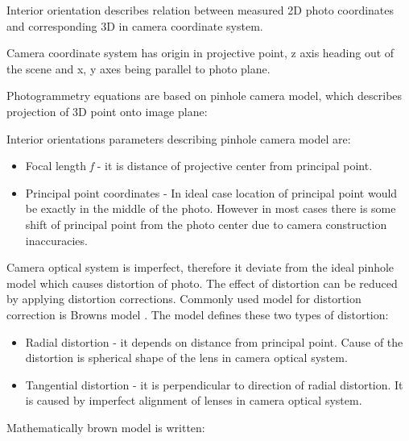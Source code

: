 \documentclass[a4paper,12pt]{article}
\newcommand{\escal}[1]{
{\it #1}
}
\begin{document}
Interior orientation describes relation between measured 2D photo coordinates 
and corresponding 3D in camera coordinate system.

Camera coordinate system has origin in projective point, z axis heading out of the scene  and x, y axes being parallel to photo plane. 

Photogrammetry equations are based on pinhole camera model, which describes projection of 3D point onto image plane:

Interior orientations parameters describing pinhole camera model are:
\begin{itemize}
  \item Focal length \escal{f} - it is distance of projective center from principal point.
  \item Principal point coordinates - In ideal case location of principal point would be exactly in the middle 
	of the photo.  However in most cases there is some shift of principal point from the photo center due to
	camera construction inaccuracies.
\end{itemize}

Camera optical system is imperfect, therefore it deviate from the ideal pinhole model which 
 causes distortion of photo.
The effect of distortion can be reduced by applying distortion corrections. Commonly 
used model for distortion correction is Browns model \cite{brown1966distortion}.
The model defines these two types of distortion:
\begin{itemize}
  \item Radial distortion - it depends on distance from principal point. Cause of the distortion is spherical shape of the 
  lens in camera optical system.
  \item Tangential distortion - it is perpendicular to direction of radial distortion. It is caused by 
       imperfect alignment of lenses in camera optical system.
\end{itemize}

Mathematically brown model is written:
\end{document}
